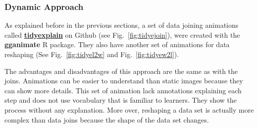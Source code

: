 \subsubsection{Dynamic Approach}


As explained before in the previous sections, a set of data joining animations called \href{https://github.com/gadenbuie/tidyexplain}{\textbf{tidyexplain}}  on \textsf{Github} (see Fig.~\ref{fig:tidyejoin}), were created with the \textbf{gganimate} \textsf{R} package. They also have another set of animations for data reshaping (See Fig.~\ref{fig:tidyel2w} and Fig.~\ref{fig:tidyew2l}). 

The advantages and disadvantages of this approach are the same as with the joins. Animations can be easier to understand than static images because they can show more details. This set of animation lack annotations explaining each step and does not use vocabulary that is familiar to learners. They show the process without any explanation.  More over, reshaping a data set is actually more complex than data joins because the shape of the data set changes.
\newpage 
